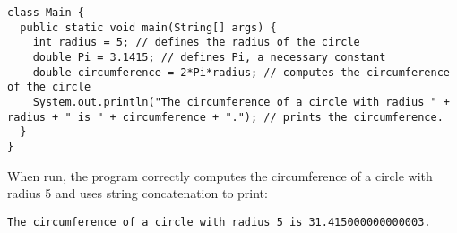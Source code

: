 \documentclass{article}
\begin{document}
\begin{verbatim}
class Main {
  public static void main(String[] args) {
    int radius = 5; // defines the radius of the circle
    double Pi = 3.1415; // defines Pi, a necessary constant
    double circumference = 2*Pi*radius; // computes the circumference of the circle
    System.out.println("The circumference of a circle with radius " + radius + " is " + circumference + "."); // prints the circumference.
  }
}
\end{verbatim}

When run, the program correctly computes the circumference of a circle with radius 5 and uses string concatenation to print:

\small
\begin{verbatim}
The circumference of a circle with radius 5 is 31.415000000000003.
\end{verbatim}
\end{document}
